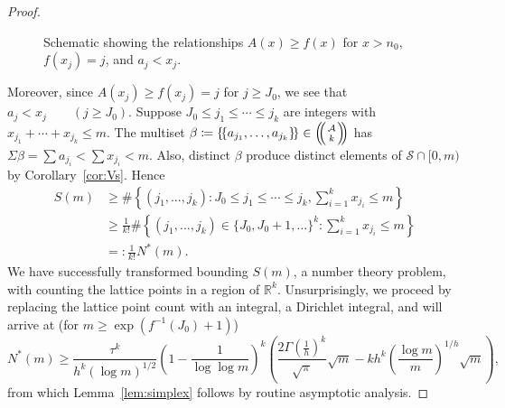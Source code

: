 \documentclass[10pt,letterpaper]{article}
\newcommand{\RR}{\ensuremath{\mathbb R}}
\newcommand{\cA}{\mathcal{A}}
\newcommand{\cS}{\mathcal{S}}
\DeclarePairedDelimiter{\multi}{\{\!\{}{\}\!\}}
\newcommand{\multibinom}[2]{\left(\kern-0.3em\left(\genfrac{}{}{0pt}{}{#1}{#2}\right)\kern-0.3em\right)}
\theoremstyle{remark}
\begin{document}
\begin{proof}
\begin{figure}[t]
\begin{center}
{}
\end{center}
\caption{Schematic showing the relationships $A(x)\ge f(x)$ for $x> n_0$, $f(x_j)=j$, and $a_j < x_j$.}
\label{fig:x and y}
\end{figure}

Moreover, since $A(x_j) \ge f(x_j)=j$ for $j\ge J_0$, we see that \(a_j < x_j \qquad (j\ge J_0).\)
Suppose $J_0\le j_1\le\cdots\le j_k$ are integers with $x_{j_1}+\cdots+x_{j_k}\le m$. The multiset $\beta\coloneqq \multi{a_{j_1},\dots,a_{j_k}}\in\multibinom{\cA}{k}$ has $\Sigma\beta=\sum a_{j_i}< \sum x_{j_i} <m$. Also, distinct $\beta$ produce distinct elements of $\cS\cap[0,m)$ by Corollary~\ref{cor:Vs}. 
Hence
  \begin{align*}
    S(m) 
    &\ge \#\left\{(j_1,\dots,j_k) : J_0\le j_1\le\cdots\le j_k,
        \sum_{i=1}^k x_{j_i}\le m\right\} \\
    &\ge \frac{1}{k!} \#\left\{(j_1,\dots,j_k)\in\{J_0,J_0+1,\dots\}^k :
    \sum_{i=1}^k x_{j_i}\le m\right\} \\
    &=: \frac{1}{k!} N^*(m).
  \end{align*}
We have successfully transformed bounding $S(m)$, a number theory problem, with counting the lattice points in a region of $\RR^k$. Unsurprisingly, we proceed by replacing the lattice point count with an integral, a Dirichlet integral, and will arrive at (for $m\ge \exp(f^{-1}(J_0)+1)$)
  \begin{equation*}
    N^{*}(m) \ge \frac{\tau^k}{h^k(\log m)^{1/2}} \left( 1-\frac{1}{\log \log m} \right)^k
  \left(\frac{2\Gamma(\tfrac1h)^k}{\sqrt{\pi}}\sqrt m - k h^k \left(\frac{\log m}{m}\right)^{1/h}\sqrt{m}\right),
  \end{equation*}
from which Lemma~\ref{lem:simplex} follows by routine asymptotic analysis.


\end{proof}
\end{document}
